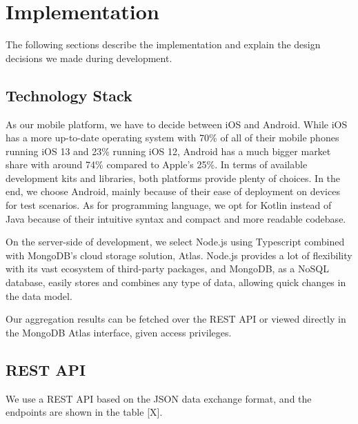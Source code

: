 
\chapter{Implementation}\label{chapter:implementation}

The following sections describe the implementation and explain the design decisions we made during development. 

\section{Technology Stack}

As our mobile platform, we have to decide between iOS and Android. While iOS has a more up-to-date operating system with 70\% of all of their mobile phones running iOS 13 and 23\% running iOS 12, Android has a much bigger market share with around 74\% compared to Apple's 25\%. 
In terms of available development kits and libraries, both platforms provide plenty of choices. In the end, we choose Android, mainly because of their ease of deployment on devices for test scenarios. As for programming language, we opt for Kotlin instead of Java because of their intuitive syntax and compact and more readable codebase.

On the server-side of development, we select Node.js using Typescript combined with MongoDB's cloud storage solution, Atlas. Node.js provides a lot of flexibility with its vast ecosystem of third-party packages, and MongoDB, as a NoSQL database, easily stores and combines any type of data, allowing quick changes in the data model.


Our aggregation results can be fetched over the REST API or viewed directly in the MongoDB Atlas interface, given access privileges.

\section{REST API}
\label{sec:hello}
We use a REST API based on the JSON data exchange format, and the endpoints are shown in the table [X].

